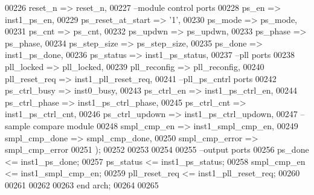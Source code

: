 \begin{DoxyCode}
00226       reset_n           => reset_n,
00227 \textcolor{keyword}{      --module control ports}
00228       ps_en             => inst1_ps_en,
00229       ps_reset_at_start => '1',
00230       ps_mode           => ps_mode,
00231       ps_cnt            => ps_cnt,
00232       ps_updwn          => ps_updwn,
00233       ps_phase          => ps_phase,
00234       ps_step_size      => ps_step_size,
00235       ps_done           => inst1_ps_done,
00236       ps_status         => inst1_ps_status,
00237 \textcolor{keyword}{      --pll ports}
00238       pll_locked        => pll_locked,
00239       pll_reconfig      => pll_reconfig,
00240       pll_reset_req     => inst1_pll_reset_req,
00241 \textcolor{keyword}{      --pll\_ps\_cntrl ports}
00242       ps_ctrl_busy      => inst0_busy,
00243       ps_ctrl_en        => inst1_ps_ctrl_en,
00244       ps_ctrl_phase     => inst1_ps_ctrl_phase,
00245       ps_ctrl_cnt       => inst1_ps_ctrl_cnt,
00246       ps_ctrl_updown    => inst1_ps_ctrl_updown,
00247 \textcolor{keyword}{      --sample compare module}
00248       smpl_cmp_en       => inst1_smpl_cmp_en,
00249       smpl_cmp_done     => smpl_cmp_done,
00250       smpl_cmp_error    => smpl_cmp_error
00251       \textcolor{vhdlchar}{)};
00252       
00253    
00254    
00255 \textcolor{keyword}{   --output ports}
00256    \textcolor{vhdlchar}{ps_done}        \textcolor{vhdlchar}{<=} \textcolor{vhdlchar}{inst1_ps_done};
00257    \textcolor{vhdlchar}{ps_status}      \textcolor{vhdlchar}{<=} \textcolor{vhdlchar}{inst1_ps_status};
00258    \textcolor{vhdlchar}{smpl_cmp_en}    \textcolor{vhdlchar}{<=} \textcolor{vhdlchar}{inst1_smpl_cmp_en};
00259    \textcolor{vhdlchar}{pll_reset_req}  \textcolor{vhdlchar}{<=} \textcolor{vhdlchar}{inst1_pll_reset_req};
00260    
00261 
00262   
00263 \textcolor{keywordflow}{end} \textcolor{vhdlchar}{arch};   
00264 
00265 
\end{DoxyCode}
